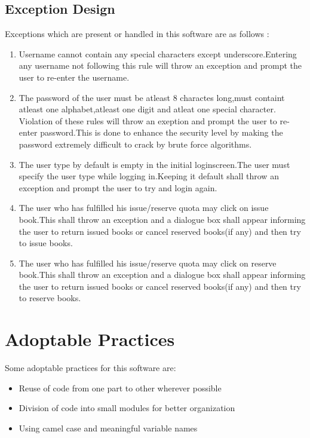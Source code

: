 \documentclass[a4paper]{article}
\begin{document}
\subsection{Exception Design}
Exceptions which are present or handled in this software are as follows :
\begin{enumerate}
\item Username cannot contain any special characters except underscore.Entering any username not following this rule will throw an exception and prompt the user to re-enter the username.
\item The password of the user must be atleast 8 charactes long,must containt atleast one alphabet,atleast one digit and atleat one special character. Violation of these rules will throw an exeption and prompt the user to re-enter password.This is done to enhance the security level by making the password extremely difficult to crack by brute force algorithms.
\item The user type by default is empty in the initial  loginscreen.The user must specify the user type while logging in.Keeping it default shall throw an exception and prompt the user to try and login again.
\item The user who has fulfilled his issue/reserve quota may click on issue book.This shall throw an exception and a dialogue box shall appear informing the user to return issued books or cancel reserved books(if any) and then try to issue books.
\item The user who has fulfilled his issue/reserve quota may click on reserve book.This shall throw an exception and a dialogue box shall appear informing the user to return issued books or cancel reserved books(if any) and then try to reserve books.
\end{enumerate}
\section{Adoptable Practices}
Some adoptable practices for this software are:
\begin{itemize}
\item Reuse of code from one part to other wherever possible
\item Division of code into small modules for better organization
\item Using camel case and meaningful variable names
\end{itemize}
\end{document}
